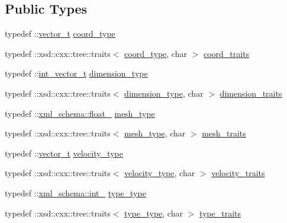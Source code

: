 \subsection*{Public Types}
\begin{DoxyCompactItemize}
\item 
typedef \+::\hyperlink{classvector__t}{vector\+\_\+t} \hyperlink{classcuboid__t_aa3c19ea94c59ed982641ca39a420a041}{coord\+\_\+type}
\item 
typedef \+::xsd\+::cxx\+::tree\+::traits$<$ \hyperlink{classcuboid__t_aa3c19ea94c59ed982641ca39a420a041}{coord\+\_\+type}, char $>$ \hyperlink{classcuboid__t_a9aa6a75493e47a7f976c08e9be597b54}{coord\+\_\+traits}
\item 
typedef \+::\hyperlink{classint__vector__t}{int\+\_\+vector\+\_\+t} \hyperlink{classcuboid__t_a0992ec1724eb71e76babf752bbe9189b}{dimension\+\_\+type}
\item 
typedef \+::xsd\+::cxx\+::tree\+::traits$<$ \hyperlink{classcuboid__t_a0992ec1724eb71e76babf752bbe9189b}{dimension\+\_\+type}, char $>$ \hyperlink{classcuboid__t_aed028730d651f8447c9243431c31b176}{dimension\+\_\+traits}
\item 
typedef \+::\hyperlink{namespacexml__schema_ad7e04ab17bba0b3fdde43fb79ef6ed87}{xml\+\_\+schema\+::float\+\_\+} \hyperlink{classcuboid__t_a48025da79e9243b8b1e34e696c22e06d}{mesh\+\_\+type}
\item 
typedef \+::xsd\+::cxx\+::tree\+::traits$<$ \hyperlink{classcuboid__t_a48025da79e9243b8b1e34e696c22e06d}{mesh\+\_\+type}, char $>$ \hyperlink{classcuboid__t_a67db60662cfd845bfe24613ab89f75bb}{mesh\+\_\+traits}
\item 
typedef \+::\hyperlink{classvector__t}{vector\+\_\+t} \hyperlink{classcuboid__t_a71c58ac42113feacf576245bc43d8dde}{velocity\+\_\+type}
\item 
typedef \+::xsd\+::cxx\+::tree\+::traits$<$ \hyperlink{classcuboid__t_a71c58ac42113feacf576245bc43d8dde}{velocity\+\_\+type}, char $>$ \hyperlink{classcuboid__t_ae9e44d76c104412fa2f0fb02e0b8b6f2}{velocity\+\_\+traits}
\item 
typedef \+::\hyperlink{namespacexml__schema_acfa24ac68e1a188e7f44c36f7a158bf4}{xml\+\_\+schema\+::int\+\_\+} \hyperlink{classcuboid__t_a6fb75392e8d31d56062e18b6aa2adc8a}{type\+\_\+type}
\item 
typedef \+::xsd\+::cxx\+::tree\+::traits$<$ \hyperlink{classcuboid__t_a6fb75392e8d31d56062e18b6aa2adc8a}{type\+\_\+type}, char $>$ \hyperlink{classcuboid__t_af1801e353fa239baa79a76f6942f40f9}{type\+\_\+traits}
\end{DoxyCompactItemize}
